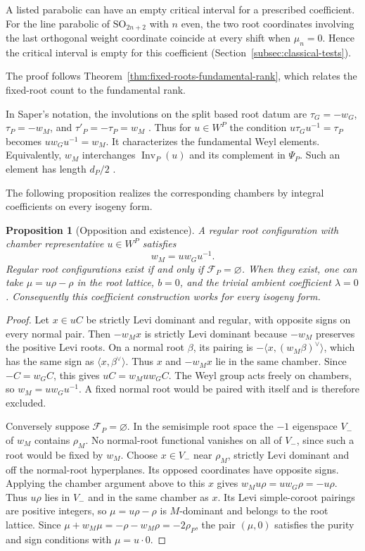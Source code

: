 \documentclass[12pt]{amsart}
\numberwithin{equation}{section}
\theoremstyle{plain}
\newtheorem{proposition}[theorem]{Proposition}
\theoremstyle{definition}
\theoremstyle{remark}
\newcommand{\SO}{\mathrm{SO}}
\DeclareMathOperator{\Inv}{Inv}
\begin{document}
A listed parabolic can have an empty critical interval for a prescribed coefficient. For the line parabolic of $\SO_{2n+2}$ with $n$ even, the two root coordinates involving the last orthogonal weight coordinate coincide at every shift when $\mu_n=0$. Hence the critical interval is empty for this coefficient (Section~\ref{subsec:classical-tests}).

The proof follows Theorem~\ref{thm:fixed-roots-fundamental-rank}, which relates the fixed-root count to the fundamental rank.

In Saper's notation, the involutions on the split based root datum are $\tau_G=-w_G$, $\tau_P=-w_M$, and $\tau'_P=-\tau_P=w_M$ \cite[(8.2.3)]{SaperMicro}. Thus for $u\in W^P$ the condition $u\tau_Gu^{-1}=\tau_P$ becomes $u w_Gu^{-1}=w_M$. It characterizes the fundamental Weyl elements. Equivalently, $w_M$ interchanges $\Inv_P(u)$ and its complement in $\Psi_P$. Such an element has length $d_P/2$ \cite[Lemmas~8.7(ii)--(iii) and 8.8(i)]{SaperMicro}.

The following proposition realizes the corresponding chambers by integral coefficients on every isogeny form.

\begin{proposition}[Opposition and existence] \label{prop:realclass-opposition}
A regular root configuration with chamber representative $u\in W^P$ satisfies
\[
 w_M=u w_Gu^{-1}.
\]
Regular root configurations exist if and only if $\mathcal F_P=\varnothing$. When they exist, one can take $\mu=u\rho-\rho$ in the root lattice, $b=0$, and the trivial ambient coefficient $\lambda=0$. Consequently this coefficient construction works for every isogeny form. 
\end{proposition}

\begin{proof}
Let \(x\in uC\) be strictly Levi dominant and regular, with opposite signs on every normal pair. Then \(-w_Mx\) is strictly Levi dominant because \(-w_M\) preserves the positive Levi roots. On a normal root \(\beta\), its pairing is \(-\langle x,(w_M\beta)^\vee\rangle\), which has the same sign as \(\langle x,\beta^\vee\rangle\).
Thus \(x\) and \(-w_Mx\) lie in the same chamber. Since \(-C=w_GC\), this gives \(uC=w_Mu w_GC\). The Weyl group acts freely on chambers, so \(w_M=u w_Gu^{-1}\). A fixed normal root would be paired with itself and is therefore excluded. 

Conversely suppose $\mathcal F_P=\varnothing$. In the semisimple root space the $-1$ eigenspace $V_-$ of $w_M$ contains $\rho_M$. No normal-root functional vanishes on all of $V_-$, since such a root would be fixed by $w_M$. Choose $x\in V_-$ near $\rho_M$, strictly Levi dominant and off the normal-root hyperplanes. Its opposed coordinates have opposite signs. Applying the chamber argument above to this \(x\) gives \(w_Mu\rho=uw_G\rho=-u\rho\). Thus $u\rho$ lies in $V_-$ and in the same chamber as $x$. Its Levi simple-coroot pairings are positive integers, so $\mu=u\rho-\rho$ is $M$-dominant and belongs to the root lattice. Since $\mu+w_M\mu=-\rho-w_M\rho=-2\rho_P$, the pair $(\mu,0)$ satisfies the purity and sign conditions with $\mu=u\cdot0$.
\end{proof}
\end{document}

